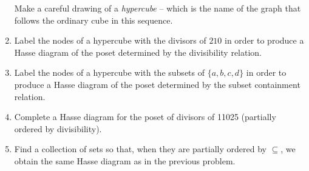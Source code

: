 \begin{enumerate}
Make a careful drawing of a \emph{hypercube} -- which is
the name of the graph that follows the ordinary cube in this sequence.

\item Label the nodes of a hypercube with the divisors of $210$ in order to
produce a Hasse diagram of the poset determined by the divisibility relation.

\item Label the nodes of a hypercube with the subsets of $\{a,b,c,d\}$ 
in order to produce a Hasse diagram of the poset determined by the 
subset containment relation.
  
\item Complete a Hasse diagram for the poset of divisors of 11025 (partially ordered by divisibility).

\item Find a collection of sets so that, when they are partially ordered by $\subseteq$, we obtain the same Hasse diagram as in the previous problem.

\end{enumerate}

